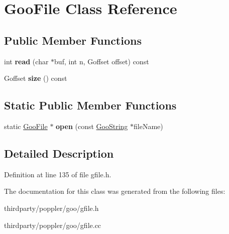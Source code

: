 \hypertarget{class_goo_file}{}\section{Goo\+File Class Reference}
\label{class_goo_file}
\subsection*{Public Member Functions}
\begin{DoxyCompactItemize}
\item 
\mbox{\label{class_goo_file_a580311b38500ba22d39af7945cc50416}} 
int {\bfseries read} (char $\ast$buf, int n, Goffset offset) const
\item 
\mbox{\label{class_goo_file_aafbbc68ffbd81b0b39d2a7955ccc6271}} 
Goffset {\bfseries size} () const
\end{DoxyCompactItemize}
\subsection*{Static Public Member Functions}
\begin{DoxyCompactItemize}
\item 
\mbox{\label{class_goo_file_ad935450357c2ed18e6efc38ee8cfd368}} 
static \hyperlink{class_goo_file}{Goo\+File} $\ast$ {\bfseries open} (const \hyperlink{class_goo_string}{Goo\+String} $\ast$file\+Name)
\end{DoxyCompactItemize}


\subsection{Detailed Description}


Definition at line 135 of file gfile.\+h.



The documentation for this class was generated from the following files\+:\begin{DoxyCompactItemize}
\item 
thirdparty/poppler/goo/gfile.\+h\item 
thirdparty/poppler/goo/gfile.\+cc\end{DoxyCompactItemize}
